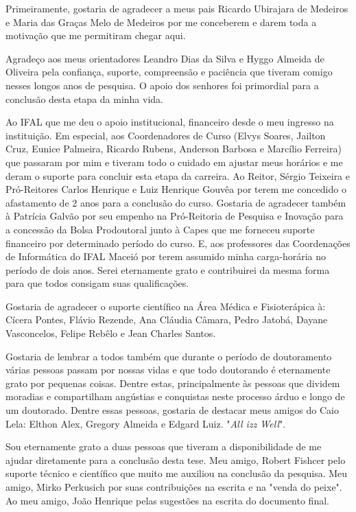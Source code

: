 Primeiramente, gostaria de agradecer a meus pais Ricardo Ubirajara de Medeiros e Maria das Graças Melo de Medeiros por me conceberem e darem toda a motivação que me permitiram chegar aqui.

Agradeço aos meus orientadores Leandro Dias da Silva e Hyggo Almeida de Oliveira pela confiança, suporte, compreensão e paciência que tiveram comigo nesses longos anos de pesquisa. O apoio dos senhores foi primordial para a conclusão desta etapa da minha vida.

Ao IFAL que me deu o apoio institucional, financeiro desde o meu ingresso na instituição. Em especial, aos Coordenadores de Curso (Elvys Soares, Jailton Cruz, Eunice Palmeira, Ricardo Rubens, Anderson Barbosa e Marcílio Ferreira) que passaram por mim e tiveram todo o cuidado em ajustar meus horários e me deram o suporte para concluir esta etapa da carreira. Ao Reitor, Sérgio Teixeira e Pró-Reitores Carlos Henrique e Luiz Henrique Gouvêa por terem me concedido o afastamento de 2 anos para a conclusão do curso. Gostaria de agradecer também à Patrícia Galvão por seu empenho na Pró-Reitoria de Pesquisa e Inovação para a concessão da Bolsa Prodoutoral junto à Capes que me forneceu suporte financeiro por determinado período do curso. E, aos professores das Coordenações de Informática do IFAL Maceió por terem assumido minha carga-horária no período de dois anos. Serei eternamente grato e contribuirei da mesma forma para que todos consigam suas qualificações.

Gostaria de agradecer o suporte científico na Área Médica e Fisioterápica à: Cícera Pontes, Flávio Rezende, Ana Cláudia Câmara, Pedro Jatobá, Dayane Vasconcelos, Felipe Rebêlo e Jean Charles Santos.

Gostaria de lembrar a todos também que durante o período de doutoramento várias pessoas passam por nossas vidas e que todo doutorando é eternamente grato por pequenas coisas. Dentre estas, principalmente às pessoas que dividem moradias e compartilham angústias e conquistas neste processo árduo e longo de um doutorado. Dentre essas pessoas, gostaria de destacar meus amigos do Caio Lela: Elthon Alex, Gregory Almeida e Edgard Luiz. "\textit{All izz Well}".

Sou eternamente grato a duas pessoas que tiveram a disponibilidade de me ajudar diretamente para a conclusão desta tese. Meu amigo, Robert Fishcer pelo suporte técnico e científico que muito me auxiliou na conclusão da pesquisa. Meu amigo, Mirko Perkusich por suas contribuições na escrita e na "venda do peixe". Ao meu amigo, João Henrique pelas sugestões na escrita do documento final.

